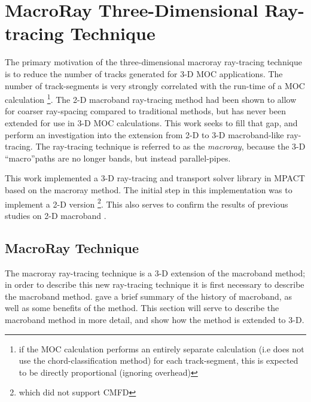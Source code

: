 \chapter{MacroRay Three-Dimensional Ray-tracing Technique}{\label{ch:MacroRay}
  
  
  
  \def\figpath{chapters/MacroRay/figures/}
  \graphicspath{ {\figpath} }

  The primary motivation of the three-dimensional macroray ray-tracing technique is to reduce the number of tracks generated for 3-D \ac{MOC} applications.
  The number of track-segments is very strongly correlated with the run-time of a \ac{MOC} calculation \footnote{if the \ac{MOC} calculation performs an entirely separate calculation (i.e does not use the chord-classification method) for each track-segment, this is expected to be directly proportional (ignoring overhead)}.
  The 2-D macroband ray-tracing method had been shown to allow for coarser ray-spacing compared to traditional methods, but has never been extended for use in 3-D \ac{MOC} calculations.
  This work seeks to fill that gap, and perform an investigation into the extension from 2-D to 3-D macroband-like ray-tracing.
  The ray-tracing technique is referred to as the \emph{macroray}, because the 3-D ``macro''paths are no longer bands, but instead parallel-pipes.

  This work implemented a 3-D ray-tracing and transport solver library in MPACT based on the macroray method.
  The initial step in this implementation was to implement a 2-D version \footnote{which did not support \ac{CMFD}}.
  This also serves to confirm the results of previous studies on 2-D macroband \cite{Yamamoto2005,Fevotte2007}.

  \section{MacroRay Technique}{\label{sec:MR:MacroRay Technique}
    The macroray ray-tracing technique is a 3-D extension of the macroband method; in order to describe this new ray-tracing technique it is first necessary to describe the macroband method.
     gave a brief summary of the history of macroband, as well as some benefits of the method.
    This section will serve to describe the macroband method in more detail, and show how the method is extended to 3-D.

}}
